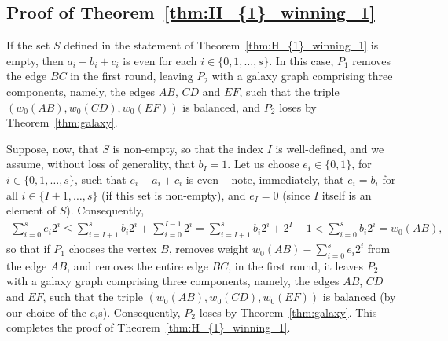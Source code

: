 \documentclass[11pt,reqno]{amsart}
\theoremstyle{definition}
\theoremstyle{definition}
\begin{document}
\sloppy \subsection{Proof of Theorem~\ref{thm:H_{1}_winning_1}} If the set $S$ defined in the statement of Theorem~\ref{thm:H_{1}_winning_1} is empty, then $a_{i}+b_{i}+c_{i}$ is even for each $i \in \{0,1,\ldots,s\}$. In this case, $P_{1}$ removes the edge $BC$ in the first round, leaving $P_{2}$ with a galaxy graph comprising three components, namely, the edges $AB$, $CD$ and $EF$, such that the triple $(w_{0}(AB),w_{0}(CD),w_{0}(EF))$ is balanced, and $P_{2}$ loses by Theorem~\ref{thm:galaxy}.

Suppose, now, that $S$ is non-empty, so that the index $I$ is well-defined, and we assume, without loss of generality, that $b_{I}=1$. Let us choose $e_{i}\in \{0,1\}$, for $i \in \{0,1,\ldots,s\}$, such that $e_{i}+a_{i}+c_{i}$ is even -- note, immediately, that $e_{i}=b_{i}$ for all $i \in \{I+1,\ldots,s\}$ (if this set is non-empty), and $e_{I}=0$ (since $I$ itself is an element of $S$). Consequently,
\begin{align}
\sum_{i=0}^{s}e_{i}2^{i}\leqslant\sum_{i=I+1}^{s}b_{i}2^{i}+\sum_{i=0}^{I-1}2^{i}=\sum_{i=I+1}^{s}b_{i}2^{i}+2^{I}-1<\sum_{i=0}^{s}b_{i}2^{i}=w_{0}(AB),\nonumber
\end{align}
so that if $P_{1}$ chooses the vertex $B$, removes weight $w_{0}(AB)-\sum_{i=0}^{s}e_{i}2^{i}$ from the edge $AB$, and removes the entire edge $BC$, in the first round, it leaves $P_{2}$ with a galaxy graph comprising three components, namely, the edges $AB$, $CD$ and $EF$, such that the triple $(w_{0}(AB),w_{0}(CD),w_{0}(EF))$ is balanced (by our choice of the $e_{i}$s). Consequently, $P_{2}$ loses by Theorem~\ref{thm:galaxy}. This completes the proof of Theorem~\ref{thm:H_{1}_winning_1}.
\end{document}
